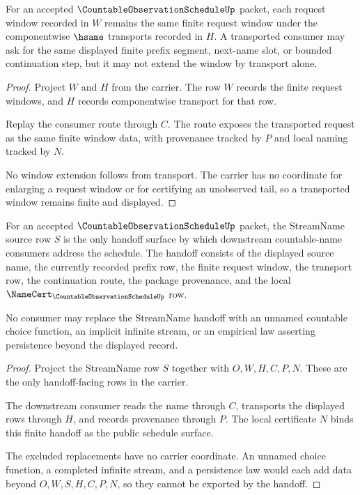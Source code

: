 \begin{theorem}
\label{thm:countable-observation-schedule-window-stability}
For an accepted $\CountableObservationScheduleUp$ packet, each request window recorded in $W$ remains the same finite request window under the componentwise $\hsame$ transports recorded in $H$. A transported consumer may ask for the same displayed finite prefix segment, next-name slot, or bounded continuation step, but it may not extend the window by transport alone.
\end{theorem}
\begin{proof}
Project $W$ and $H$ from the carrier. The row $W$ records the finite request windows, and $H$ records componentwise transport for that row.

Replay the consumer route through $C$. The route exposes the transported request as the same finite window data, with provenance tracked by $P$ and local naming tracked by $N$.

No window extension follows from transport. The carrier has no coordinate for enlarging a request window or for certifying an unobserved tail, so a transported window remains finite and displayed.
\end{proof}

\begin{theorem}
\label{thm:countable-observation-schedule-streamname-handoff}
For an accepted $\CountableObservationScheduleUp$ packet, the StreamName source row $S$ is the only handoff surface by which downstream countable-name consumers address the schedule. The handoff consists of the displayed source name, the currently recorded prefix row, the finite request window, the transport row, the continuation route, the package provenance, and the local $\NameCert_{\CountableObservationScheduleUp}$ row.

No consumer may replace the StreamName handoff with an unnamed countable choice function, an implicit infinite stream, or an empirical law asserting persistence beyond the displayed record.
\end{theorem}
\begin{proof}
Project the StreamName row $S$ together with $O,W,H,C,P,N$. These are the only handoff-facing rows in the carrier.

The downstream consumer reads the name through $C$, transports the displayed rows through $H$, and records provenance through $P$. The local certificate $N$ binds this finite handoff as the public schedule surface.

The excluded replacements have no carrier coordinate. An unnamed choice function, a completed infinite stream, and a persistence law would each add data beyond $O,W,S,H,C,P,N$, so they cannot be exported by the handoff.
\end{proof}

